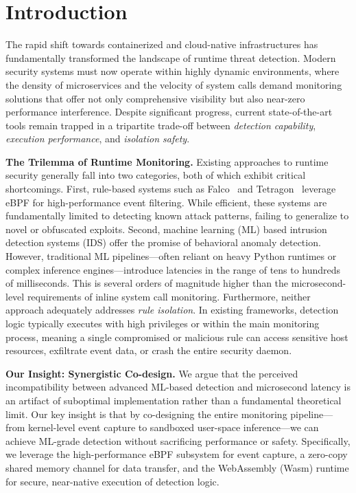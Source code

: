 \section{Introduction}
\label{sec:introduction}

The rapid shift towards containerized and cloud-native infrastructures has fundamentally transformed the landscape of runtime threat detection.
Modern security systems must now operate within highly dynamic environments, where the density of microservices and the velocity of system calls demand monitoring solutions that offer not only comprehensive visibility but also near-zero performance interference.
Despite significant progress, current state-of-the-art tools remain trapped in a tripartite trade-off between \textit{detection capability}, \textit{execution performance}, and \textit{isolation safety}.

\textbf{The Trilemma of Runtime Monitoring.}
Existing approaches to runtime security generally fall into two categories, both of which exhibit critical shortcomings.
First, rule-based systems such as Falco~\cite{falco} and Tetragon~\cite{tetragon} leverage eBPF for high-performance event filtering. While efficient, these systems are fundamentally limited to detecting known attack patterns, failing to generalize to novel or obfuscated exploits.
Second, machine learning (ML) based intrusion detection systems (IDS) offer the promise of behavioral anomaly detection. However, traditional ML pipelines—often reliant on heavy Python runtimes or complex inference engines—introduce latencies in the range of tens to hundreds of milliseconds. This is several orders of magnitude higher than the microsecond-level requirements of inline system call monitoring.
Furthermore, neither approach adequately addresses \textit{rule isolation}. In existing frameworks, detection logic typically executes with high privileges or within the main monitoring process, meaning a single compromised or malicious rule can access sensitive host resources, exfiltrate event data, or crash the entire security daemon.

\textbf{Our Insight: Synergistic Co-design.}
We argue that the perceived incompatibility between advanced ML-based detection and microsecond latency is an artifact of suboptimal implementation rather than a fundamental theoretical limit.
Our key insight is that by co-designing the entire monitoring pipeline—from kernel-level event capture to sandboxed user-space inference—we can achieve ML-grade detection without sacrificing performance or safety.
Specifically, we leverage the high-performance eBPF subsystem for event capture, a zero-copy shared memory channel for data transfer, and the WebAssembly (Wasm) runtime for secure, near-native execution of detection logic.

